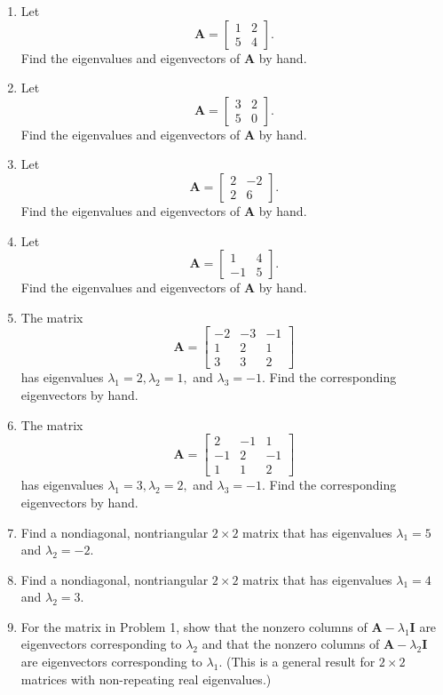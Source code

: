 \documentclass[
]{book}
\theoremstyle{definition}
\theoremstyle{definition}
\theoremstyle{definition}
\theoremstyle{definition}
\theoremstyle{remark}
\begin{document}
\begin{enumerate}
\def\labelenumi{\arabic{enumi}.}
\item
  Let
  \[\mathbf{A}=\begin{bmatrix} 1 & 2\\5 & 4\end{bmatrix}.\]
  Find the eigenvalues and eigenvectors of \(\mathbf{A}\) by hand.
\item
  Let
  \[\mathbf{A}=\begin{bmatrix} 3 & 2\\5 & 0\end{bmatrix}.\]
  Find the eigenvalues and eigenvectors of \(\mathbf{A}\) by hand.
\item
  Let
  \[\mathbf{A}=\begin{bmatrix} 2 & -2\\2 & 6\end{bmatrix}.\]
  Find the eigenvalues and eigenvectors of \(\mathbf{A}\) by hand.
\item
  Let
  \[\mathbf{A}=\begin{bmatrix} 1 & 4\\-1 & 5\end{bmatrix}.\]
  Find the eigenvalues and eigenvectors of \(\mathbf{A}\) by hand.
\item
  The matrix
  \[\mathbf{A}=\begin{bmatrix} -2 & -3 & -1\\1 & 2 & 1\\3 & 3 & 2\end{bmatrix}\]
  has eigenvalues \(\lambda_1=2, \lambda_2=1,\) and \(\lambda_3=-1.\) Find the corresponding eigenvectors by hand.
\item
  The matrix
  \[\mathbf{A}=\begin{bmatrix} 2 & -1 & 1\\-1 & 2 & -1\\1 & 1 & 2\end{bmatrix}\]
  has eigenvalues \(\lambda_1=3, \lambda_2=2,\) and \(\lambda_3=-1.\) Find the corresponding eigenvectors by hand.
\item
  Find a nondiagonal, nontriangular \(2\times 2\) matrix that has eigenvalues \(\lambda_1=5\) and \(\lambda_2=-2.\)
\item
  Find a nondiagonal, nontriangular \(2\times 2\) matrix that has eigenvalues \(\lambda_1=4\) and \(\lambda_2=3.\)
\item
  For the matrix in Problem 1, show that the nonzero columns of \(\mathbf{A}-\lambda_1\mathbf{I}\) are eigenvectors corresponding to \(\lambda_2\) and that the nonzero columns of \(\mathbf{A}-\lambda_2\mathbf{I}\) are eigenvectors corresponding to \(\lambda_1.\) (This is a general result for \(2\times 2\) matrices with non-repeating real eigenvalues.)

\end{enumerate}
\end{document}
